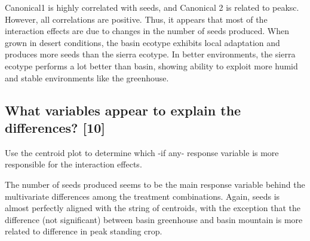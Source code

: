 \documentclass{article}
\begin{document}
Canonical1 is highly correlated with seeds, and Canonical 2 is related to peaksc. However, all correlations are positive. Thus, it appears that most of the interaction effects are due to changes in the number of seeds produced. When grown in desert conditions, the basin ecotype exhibits local adaptation and produces more seeds than the sierra ecotype. In better environments, the sierra ecotype performs a lot better than basin, showing ability to exploit more humid and stable environments like the greenhouse.

\subsection{What variables appear to explain the differences?  [10]}

Use the centroid plot to determine which -if any- response variable is more responsible for the interaction effects.

The number of seeds produced seems to be the main response variable behind the multivariate differences among the treatment combinations. Again, seeds is almost perfectly aligned with the string of centroids, with the exception that the difference (not significant) between basin greenhouse and basin mountain is more related to difference in peak standing crop.
\end{document}
